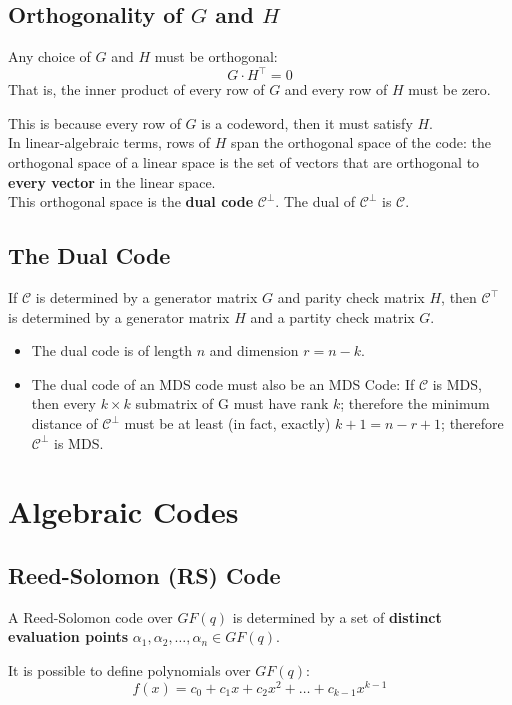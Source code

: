 \documentclass[11pt]{article}
\begin{document}
\subsection{Orthogonality of $G$ and $H$}
Any choice of $G$ and $H$ must be orthogonal:
\[
  G \cdot H^\intercal = 0
\]
That is, the inner product of every row of $G$ and every row of $H$ must be zero.

This is because every row of $G$ is a codeword, then it must satisfy $H$. \\

In linear-algebraic terms, rows of $H$ span the orthogonal space of the code: the orthogonal space of a linear space is the set of vectors that are orthogonal to \textbf{every vector} in the linear space. \\

This orthogonal space is the \textbf{dual code} $\mathcal{C}^\bot$.
The dual of $\mathcal{C}^\bot$ is $\mathcal{C}$.

\subsection{The Dual Code}
If $\mathcal{C}$ is determined by a generator matrix $G$ and parity check matrix $H$, then $\mathcal{C}^\intercal$ is determined by a generator matrix $H$ and a partity check matrix $G$.

\begin{itemize}
  \item The dual code is of length $n$ and dimension $r = n - k$.
  \item The dual code of an MDS code must also be an MDS Code:
    If $\mathcal{C}$ is MDS, then every $k \times k$ submatrix of G must have rank $k$; therefore the minimum distance of $\mathcal{C}^\bot$ must be at least (in fact, exactly) $k + 1 = n - r + 1$; therefore $\mathcal{C}^\bot$ is MDS.
\end{itemize}

\section{Algebraic Codes}
\subsection{Reed-Solomon (RS) Code}
A Reed-Solomon code over $GF(q)$ is determined by a set of \textbf{distinct evaluation points} $\alpha_1, \alpha_2, \ldots, \alpha_n \in GF(q)$.

It is possible to define polynomials over $GF(q)$:
\[
  f(x) = c_0 + c_1x + c_2x^2 + \ldots + c_{k - 1}x^{k - 1}
\]
\end{document}
